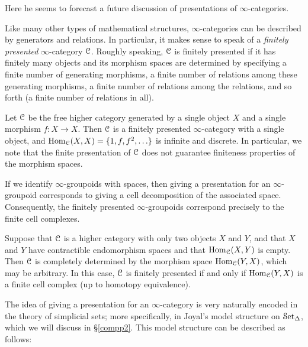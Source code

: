\begin{1.2.14 Presentations of inf-cats}
\begin{shaded}
Here he seems to forecast a future discussion of presentations of $\infty$-categories.
\end{shaded}
Like many other types of mathematical structures, $\infty$-categories can be described by generators and relations. In particular, it makes sense to speak of a {\it
finitely presented} $\infty$-category $\operatorname{\mathcal{C}}$. Roughly speaking, $\operatorname{\mathcal{C}}$ is finitely presented
if it has finitely many objects and its morphism spaces are determined
by specifying a finite number of generating morphisms, a finite
number of relations among these generating morphisms, a finite
number of relations among the relations, and so forth (a finite
number of relations in all).

\begin{example}\label{infinitemorphisms}
Let $\operatorname{\mathcal{C}}$ be the free higher category generated by a single
object $X$ and a single morphism $f: X \rightarrow X$. Then
$\operatorname{\mathcal{C}}$ is a finitely presented $\infty$-category with a single
object, and $\operatorname{Hom}_{\operatorname{\mathcal{C}}}(X,X) = \{ 1, f, f^2, \ldots \}$ is
infinite and discrete. In particular, we note that the finite
presentation of $\operatorname{\mathcal{C}}$ does not guarantee finiteness properties
of the morphism spaces.
\end{example}

\begin{example}
If we identify $\infty$-groupoids with spaces, then giving a
presentation for an $\infty$-groupoid corresponds to giving a cell
decomposition of the associated space. Consequently, the finitely
presented $\infty$-groupoids correspond precisely to the finite
cell complexes.
\end{example}

\begin{example}
Suppose that $\operatorname{\mathcal{C}}$ is a higher category with only two objects
$X$ and $Y$, and that $X$ and $Y$ have contractible endomorphism
spaces and that $\operatorname{Hom}_{\operatorname{\mathcal{C}}}(X,Y)$ is empty. Then $\operatorname{\mathcal{C}}$ is
completely determined by the morphism space $\operatorname{Hom}_{\operatorname{\mathcal{C}}}(Y,X)$,
which may be arbitrary. In this case, $\operatorname{\mathcal{C}}$ is finitely
presented if and only if $\operatorname{Hom}_{\operatorname{\mathcal{C}}}(Y,X)$ is a finite cell
complex (up to homotopy equivalence).
\end{example}

The idea of giving a presentation for an $\infty$-category is very
naturally encoded in the theory of simplicial sets; more
specifically, in Joyal's model structure on $\operatorname{\mathcal{S}et_{\Delta}}$, which we will discuss in
\S \ref{compp2}. This model structure can be described as follows:


\end{1.2.14 Presentations of inf-cats}
